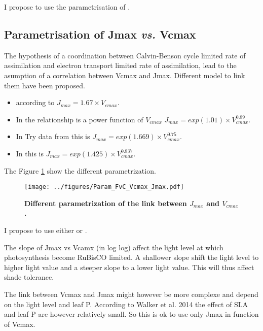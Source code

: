 \documentclass[a4paper,11pt]{article}
\begin{document}
I propose to use the parametrisation of \citet{Marechaux-2017}.


\subsection{Parametrisation of Jmax \textit{vs.} Vcmax}

The hypothesis of a coordination between Calvin-Benson cycle limited rate of assimilation and electron transport limited rate of assimilation, lead to the asumption of a correlation between Vcmax and Jmax. Different model to link them have been proposed.
\begin{itemize}

\item according to \citet{Medlyn-2002} $J_{max} = 1.67 \times  V_{cmax}$.

\item In \citet{Walker-2014} the relationship is a power function of $V_{cmax}$ $J_{max} = exp(1.01) \times V_{cmax}^{0.89}$.

\item In Try data from \citet{Kattge-2011} this is $J_{max} = exp(1.669) \times V_{cmax}^{0.75}$.

\item In \citet{Wullschleger-1993} this is $J_{max} = exp(1.425) \times V_{cmax}^{0.837}$.

\end{itemize}

The Figure \ref{fig:Vcmax_Jmax} show the different parametrization.

\begin{figure}[ht]
\centering
\texttt{[image: ../figures/Param\_FvC\_Vcmax\_Jmax.pdf]}
\caption{\textbf{Different parametrization of the link between $J_{max}$ and $V_{cmax}$.}
\label{fig:Vcmax_Jmax}}
\end{figure}

I propose to use either \citet{Medlyn-2002} or \citet{Walker-2014}.

The slope of Jmax vs Vcamx (in log log) affect the light level at which photosynthesis become RuBisCO limited. A shallower slope shift the light level to higher light value and a steeper slope to a lower light value. This will thus affect shade tolerance.

The link between Vcmax and Jmax might however be more complexe and depend on the light level and leaf P. According to Walker et al. 2014 the effect of SLA and leaf P are however relatively small. So this is ok to use only Jmax in function of Vcmax.
\end{document}
